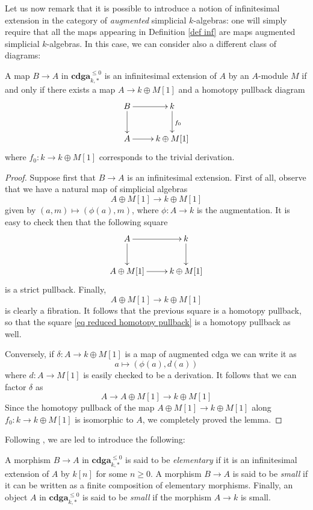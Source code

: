 \begin{refsection}
Let us now remark that it is possible to introduce a notion of infinitesimal extension in the category of \emph{augmented} simplicial $k$-algebras: one will simply require that all the maps appearing in Definition \ref{def inf} are maps augmented simplicial $k$-algebras. In this case, we can consider also a different class of diagrams:

\begin{lemma}
A map $B \to A$ in $\mathbf{cdga}_{k,*}^{\le 0}$ is an infinitesimal extension of $A$ by an $A$-module $M$ if and only if there exists a map $A \to k \oplus M[1]$ and a homotopy pullback diagram
\begin{equation} \label{eq reduced homotopy pullback}
\xymatrix{
B \ar[r] \ar[d] & k \ar[d]^{f_0} \\ A \ar[r] & k \oplus M[1]
}
\end{equation}
where $f_0 \colon k \to k \oplus M[1]$ corresponds to the trivial derivation.
\end{lemma}

\begin{proof}
Suppose first that $B \to A$ is an infinitesimal extension. First of all, observe that we have a natural map of simplicial algebras
\[
A \oplus M[1] \to k \oplus M[1]
\]
given by $(a,m) \mapsto (\phi(a),m)$, where $\phi \colon A \to k$ is the augmentation. It is easy to check then that the following square
\[
\xymatrix{
A \ar[d] \ar[r] & k \ar[d] \\ A \oplus M[1] \ar[r] & k \oplus M[1]
}
\]
is a strict pullback. Finally,
\[
A \oplus M[1] \to k \oplus M[1]
\]
is clearly a fibration. It follows that the previous square is a homotopy pullback, so that the square \eqref{eq reduced homotopy pullback} is a homotopy pullback as well.

Conversely, if $\delta \colon A \to k \oplus M[1]$ is a map of augmented cdga we can write it as
\[
a \mapsto (\phi(a), d(a))
\]
where $d \colon A \to M[1]$ is easily checked to be a derivation. It follows that we can factor $\delta$ as
\[
A \to A \oplus M[1] \to k \oplus M[1]
\]
Since the homotopy pullback of the map $A \oplus M[1] \to k \oplus M[1]$ along $f_0 \colon k \to k \oplus M[1]$ is isomorphic to $A$, we completely proved the lemma.
\end{proof}

Following \cite[Definition 1.1.5]{dagx}, we are led to introduce the following:

\begin{defin}
A morphism $B \to A$ in $\mathbf{cdga}_{k,*}^{\le 0}$ is said to be \emph{elementary} if it is an infinitesimal extension of $A$ by $k[n]$ for some $n \ge 0$. A morphism $B \to A$ is said to be \emph{small} if it can be written as a finite composition of elementary morphisms. Finally, an object $A$ in $\mathbf{cdga}_{k,*}^{\le 0}$ is said to be \emph{small} if the morphism $A \to k$ is small.
\end{defin}


\end{refsection}

